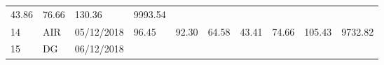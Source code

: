\documentclass[
  11pt,
]{article}
\begin{document}
\begin{longtable}[]{@{}llllllllll@{}}
\begin{minipage}[t]{0.06\columnwidth}
43.86\strut
\end{minipage} & \begin{minipage}[t]{0.06\columnwidth}\raggedright
76.66\strut
\end{minipage} & \begin{minipage}[t]{0.13\columnwidth}\raggedright
130.36\strut
\end{minipage} & \begin{minipage}[t]{0.08\columnwidth}\raggedright
9993.54\strut
\end{minipage}\tabularnewline
\begin{minipage}[t]{0.04\columnwidth}\raggedright
14\strut
\end{minipage} & \begin{minipage}[t]{0.09\columnwidth}\raggedright
AIR\strut
\end{minipage} & \begin{minipage}[t]{0.10\columnwidth}\raggedright
05/12/2018\strut
\end{minipage} & \begin{minipage}[t]{0.06\columnwidth}\raggedright
96.45\strut
\end{minipage} & \begin{minipage}[t]{0.06\columnwidth}\raggedright
92.30\strut
\end{minipage} & \begin{minipage}[t]{0.06\columnwidth}\raggedright
64.58\strut
\end{minipage} & \begin{minipage}[t]{0.06\columnwidth}\raggedright
43.41\strut
\end{minipage} & \begin{minipage}[t]{0.06\columnwidth}\raggedright
74.66\strut
\end{minipage} & \begin{minipage}[t]{0.13\columnwidth}\raggedright
105.43\strut
\end{minipage} & \begin{minipage}[t]{0.08\columnwidth}\raggedright
9732.82\strut
\end{minipage}\tabularnewline
\begin{minipage}[t]{0.04\columnwidth}\raggedright
15\strut
\end{minipage} & \begin{minipage}[t]{0.09\columnwidth}\raggedright
DG\strut
\end{minipage} & \begin{minipage}[t]{0.10\columnwidth}\raggedright
06/12/2018\strut
\end{minipage} & \begin{minipage}[t]{0.06\columnwidth}\raggedright

\end{minipage}
\end{longtable}
\end{document}
